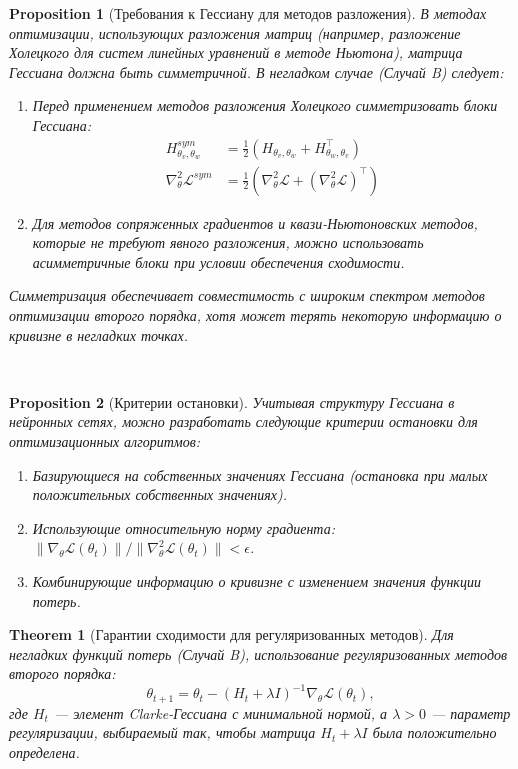 \documentclass[11pt]{article}
\newtheorem{theorem}{Theorem}
\newtheorem{proposition}{Proposition}
\begin{document}
\begin{proposition}[Требования к Гессиану для методов разложения]
  В методах оптимизации, использующих разложения матриц (например, разложение Холецкого для систем линейных
  уравнений в методе Ньютона), матрица Гессиана должна быть симметричной. В негладком случае (Случай B) следует:
  \begin{enumerate}
    \item Перед применением методов разложения Холецкого симметризовать блоки Гессиана:
      \begin{align}
        H_{\theta_v, \theta_w}^{sym} &= \frac{1}{2}(H_{\theta_v, \theta_w} + H_{\theta_w, \theta_v}^\top) \\
        \nabla^2_\theta \mathcal{L}^{sym} &= \frac{1}{2}(\nabla^2_\theta \mathcal{L} + (\nabla^2_\theta
        \mathcal{L})^\top)
      \end{align}
    \item Для методов сопряженных градиентов и квази-Ньютоновских методов, которые не требуют явного
      разложения, можно использовать асимметричные блоки при условии обеспечения сходимости.
  \end{enumerate}
  Симметризация обеспечивает совместимость с широким спектром методов оптимизации второго порядка, хотя может
  терять некоторую информацию о кривизне в негладких точках.
\end{proposition}
\
\begin{proposition}[Критерии остановки]
  Учитывая структуру Гессиана в нейронных сетях, можно разработать следующие критерии остановки для
  оптимизационных алгоритмов:
  \begin{enumerate}
    \item Базирующиеся на собственных значениях Гессиана (остановка при малых положительных собственных значениях).
    \item Использующие относительную норму градиента: $\|\nabla_\theta \mathcal{L}(\theta_t)\| /
      \|\nabla^2_\theta \mathcal{L}(\theta_t)\| < \epsilon$.
    \item Комбинирующие информацию о кривизне с изменением значения функции потерь.
  \end{enumerate}
\end{proposition}

\begin{theorem}[Гарантии сходимости для регуляризованных методов]
  Для негладких функций потерь (Случай B), использование регуляризованных методов второго порядка:
  \[
    \theta_{t+1} = \theta_t - (H_t + \lambda I)^{-1} \nabla_\theta \mathcal{L}(\theta_t),
  \]
  где $H_t$ — элемент Clarke-Гессиана с минимальной нормой, а $\lambda > 0$ — параметр регуляризации,
  выбираемый так, чтобы матрица $H_t + \lambda I$ была положительно определена.
\end{theorem}
\end{document}
